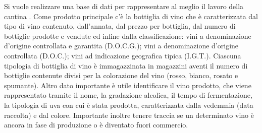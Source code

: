 Si vuole realizzare una base di dati per rappresentare al meglio il lavoro della cantina . Come prodotto principale c'è la bottiglia di vino che è caratterizzata dal tipo di vino contenuto, dall'annata, dal prezzo per bottiglia, dal numero di bottiglie prodotte e vendute ed infine dalla classificazione: vini a denominazione d'origine controllata e garantita (D.O.C.G.); vini a denominazione d'origine controllata (D.O.C.); vini ad indicazione geografica tipica (I.G.T.). Ciascuna tipologia di bottiglia di vino è immagazzinata in magazzini aventi il numero di bottiglie contenute divisi per la colorazione del vino (rosso, bianco, rosato e spumante).
Altro dato importante è utile identificare il vino prodotto, che viene rappresentato tramite il nome, la gradazione alcolica, il tempo di fermentazione, la tipologia di uva con cui è stata prodotta, caratterizzata dalla vedemmia (data raccolta) e dal colore. Importante inoltre tenere traccia se un determinato vino è ancora in fase di produzione o è diventato fuori commercio. 